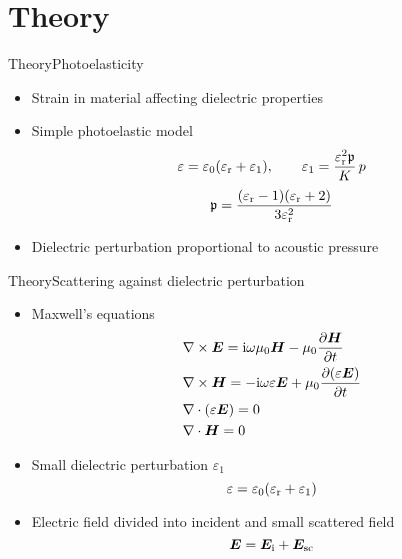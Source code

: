 \documentclass[11pt, final]{beamer}
\begin{document}
	\section{Theory}
	
	\begin{frame}{Theory}{Photoelasticity}
		\begin{itemize}
			\item Strain in material affecting dielectric properties
			\pause
			\item Simple photoelastic model
			\begin{equation*}
				\varepsilon = \varepsilon_0 (\varepsilon_{\mathrm{r}} + \varepsilon_1), \qquad \varepsilon_1 = \frac{\varepsilon_{\mathrm{r}}^2 \mathfrak{p}}{K} \,p
			\end{equation*}
			\begin{equation*}
				\mathfrak{p} = \frac{(\varepsilon_{\mathrm{r}} - 1)(\varepsilon_{\mathrm{r}} + 2)}{3\varepsilon_{\mathrm{r}}^2}
			\end{equation*}
			\pause
			\item Dielectric perturbation proportional to acoustic pressure
		\end{itemize}
	\end{frame}
	
	\begin{frame}{Theory}{Scattering against dielectric perturbation}
		\begin{itemize}
			\item Maxwell's equations
			\begin{align*}
				&\nabla \times \bm{E} = \mathrm{i}\omega \mu_0 \bm{H} - \mu_0 \frac{\partial \bm{H}}{\partial t} \\
				&\nabla \times \bm{H} = -\mathrm{i}\omega \varepsilon \bm{E} + \mu_0 \frac{\partial (\varepsilon \bm{E})}{\partial t} \\
				&\nabla \cdot (\varepsilon \bm{E}) = 0 \\
				&\nabla \cdot \bm{H} = 0
			\end{align*}
			\pause
			\item Small dielectric perturbation $\varepsilon_1$
			\begin{equation*}
				\varepsilon = \varepsilon_0(\varepsilon_{\mathrm{r}} + \varepsilon_1)
			\end{equation*}
			\item Electric field divided into incident and small scattered field
			\begin{equation*}
				\bm{E} = \bm{E}_{\mathrm{i}} + \bm{E}_{\mathrm{sc}}
			\end{equation*}
		\end{itemize}
	\end{frame}
	
\end{document}
